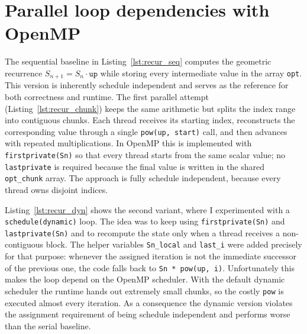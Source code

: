 \section{Parallel loop dependencies with OpenMP }

The sequential baseline in Listing~\ref{lst:recur_seq} computes the geometric recurrence
\mbox{$S_{n+1} = S_n\cdot\texttt{up}$} while storing every intermediate value in the array
\texttt{opt}.  This version is inherently schedule independent and serves as the reference for
both correctness and runtime.  The first parallel attempt (Listing~\ref{lst:recur_chunk}) keeps
the same arithmetic but splits the index range into contiguous chunks.  Each thread receives its
starting index, reconstructs the corresponding value through a single
\texttt{pow(up, start)} call, and then advances with repeated multiplications.  In OpenMP this is
implemented with \texttt{firstprivate(Sn)} so that every thread starts from the same scalar value;
no \texttt{lastprivate} is required because the final value is written in the shared 
\texttt{opt\_chunk} array.  The approach is fully schedule independent, because every thread owns
disjoint indices.

Listing~\ref{lst:recur_dyn} shows the second variant, where I experimented with a
\texttt{schedule(dynamic)} loop.  The idea was to keep using \texttt{firstprivate(Sn)} and
\texttt{lastprivate(Sn)} and to recompute the state only when a thread receives a non-contiguous
block.  The helper variables \texttt{Sn\_local} and \texttt{last\_i} were added precisely for
that purpose: whenever the assigned iteration is not the immediate successor of the previous one,
the code falls back to \texttt{Sn * pow(up, i)}.  Unfortunately this makes the loop depend on the
OpenMP scheduler.  With the default dynamic scheduler the runtime hands out extremely small
chunks, so the costly \texttt{pow} is executed almost every iteration.  As a consequence the
dynamic version violates the assignment requirement of being schedule independent and performs
worse than the serial baseline.





